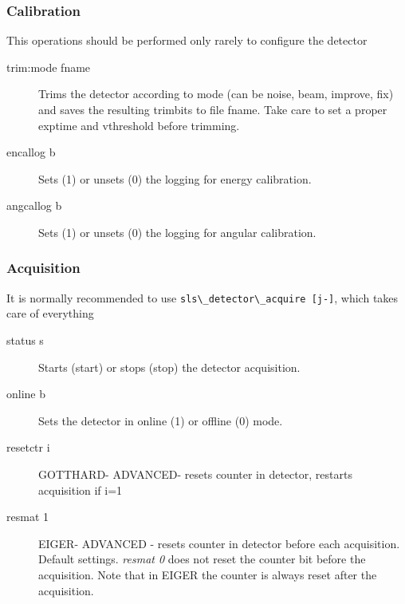 \documentclass{article}
\newcommand{\E}{EIGER\xspace}
\begin{document}
\subsubsection{Calibration}
This operations should be performed only rarely to configure the detector

\begin{description}
  \item[trim:mode fname] Trims the detector according to mode (can be noise, beam, improve, fix) and saves the resulting trimbits to file fname. Take care to set a proper exptime and vthreshold before trimming. 
  \item[encallog b] Sets (1) or unsets (0) the logging for energy calibration.
  \item[angcallog b] Sets (1) or unsets (0) the logging for angular calibration.
\end{description}




\subsubsection{Acquisition}

It is normally recommended to use \verb=sls\_detector\_acquire [j-]=, which takes care of everything
\begin{description}
\item[status s] Starts (start) or stops (stop) the detector acquisition.   
\item[online b] Sets the detector in online (1) or offline (0) mode.  
\item[resetctr i] GOTTHARD- ADVANCED- resets counter in detector, restarts acquisition if i=1
\item[resmat 1] \E - ADVANCED - resets counter in detector before each acquisition. Default settings. \textit{resmat 0} does not reset the counter bit before the acquisition. Note that in \E the counter is always reset after the acquisition.
\end{description}
\end{document}
